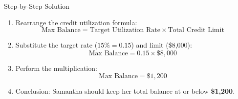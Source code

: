 \small
\begin{block}{Step-by-Step Solution}
  \begin{enumerate}
    \item Rearrange the credit utilization formula:
      \[
        \text{Max Balance} = \text{Target Utilization Rate} \times \text{Total Credit Limit}
      \]
    \item Substitute the target rate ($15\% = 0.15$) and limit (\$8,000):
      \[
        \text{Max Balance} = 0.15 \times \$8,000
      \]
    \item Perform the multiplication:
      \[
        \text{Max Balance} = \$1,200
      \]
    \item Conclusion: Samantha should keep her total balance at or below \textbf{\$1,200}.
  \end{enumerate}
\end{block}
